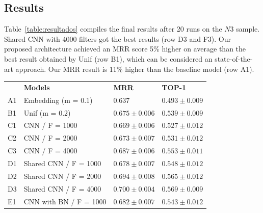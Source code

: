 \documentclass[sigconf]{acmart}
\begin{document}
\subsection{Results}

 Table~\ref{table:resultados} compiles the final results after 20 runs on the $N3$ sample. Shared CNN with 4000 filters got the best results (row D3 and F3). Our proposed architecture achieved an MRR score 5\% higher on average than the best result obtained by Unif (row B1), which can be considered an state-of-the-art approach. Our MRR result is 11\% higher than the baseline model (row A1). 

\begin{table}[t]
\centering
\begin{tabular}{ p{1cm} p{6cm} >{\raggedleft\arraybackslash}p{4cm} >{\raggedleft\arraybackslash}p{4cm} }
 \hline
    & & \multicolumn{2}{c}{\textbf{Results}}\\
 \hline
 & \textbf{Models} & \textbf{MRR} & \textbf{TOP-1}\\
 \hline
 A1 & Embedding (m = $0.1$) & $0.637$& $0.493 \pm 0.009$\\
 
 \hline
 
 B1 & Unif (m = $0.2$) & $0.675 \pm 0.006$ & $0.539 \pm 0.009$\\
 
 \hline
 
 C1 & CNN / F = 1000 & $0.669 \pm 0.006$ & $0.527 \pm 0.012$\\
 
 C2 & CNN / F = 2000 & $0.673 \pm 0.007$ & $0.531 \pm 0.012$\\
 
 C3 & CNN / F = 4000 & $0.687 \pm 0.006$ & $0.553 \pm 0.011$\\
 
 \hline
 
 D1 & Shared CNN / F = 1000 & $0.678 \pm 0.007$ & $0.548 \pm 0.012$\\
 
 D2 & Shared CNN / F = 2000 & $0.694 \pm 0.008$ & $0.565 \pm 0.012$\\
 
 D3 & Shared CNN / F = 4000 & $0.700 \pm 0.004$ & $0.569 \pm 0.009$\\
 
 \hline
 
 E1 & CNN with BN / F = 1000 & $0.682 \pm 0.007$ & $0.543 \pm 0.012$\\
 

\end{tabular}
\end{table}
\end{document}
